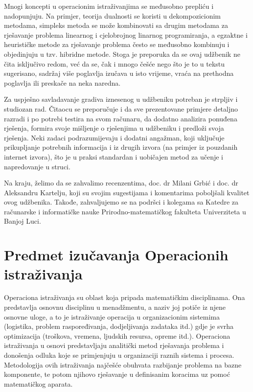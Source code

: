 \documentclass[a4paper, utf8, 11pt, colorlinks]{book}
\theoremstyle{definition}
\begin{document}
Mnogi koncepti u operacionim istraživanjima se međusobno prepliću i nadopunjuju. Na primjer, teorija dualnosti se koristi u dekompozicionim metodama, simpleks metoda se može kombinovati sa drugim metodama za rješavanje problema linearnog i cjelobrojnog linarnog programiranja, a egzaktne i heurističke metode za rješavanje problema često se međusobno kombinuju i objedinjuju u tzv. hibridne metode.
Stoga je preporuka da se ovaj udžbenik ne čita isključivo redom, već da se, čak i mnogo češće nego što je to u tekstu sugerisano, sadržaj više poglavlja izučava u isto vrijeme, vraća na prethodna poglavlja ili preskače na neka naredna.


Za uspješno savladavanje gradiva iznesenog u udžbeniku potreban je strpljiv i studiozan rad. Čitaocu se preporučuje i da sve prezentovane primjere detaljno razradi i po potrebi testira na svom računaru, da dodatno analizira ponuđena rješenja, formira svoje mišljenje o rješenjima u udžbeniku i predloži svoja rješenja. Neki zadaci podrazumijevaju i dodatni angažman, koji uključuje prikupljanje potrebnih informacija i iz drugih izvora (na primjer iz pouzdanih internet izvora),  što je u praksi standardan i uobičajen metod za učenje i napredovanje u struci.

Na kraju, želimo da se zahvalimo recenzentima, doc. dr Milani Grbić i doc. dr Aleksandru Kartelju, koji su svojim sugestijama i komentarima poboljšali kvalitet ovog udžbenika. Takođe, zahvaljujemo se na podršci i kolegama sa Katedre za računarske i informatičke nauke Prirodno-matematičkog fakulteta Univerziteta u Banjoj Luci.



\chapter{Predmet izučavanja Operacionih istraživanja}

Operaciona istraživanja su oblast koja pripada matematičkim disciplinama. Ona predstavlja osnovnu disciplinu u menadžmentu, a naziv joj potiče iz njene osnovne uloge, a to je istraživanje  operacija u organizacionim sistemima (logistika, problem raspoređivanja, dodjeljivanja zadataka itd.) gdje je svrha optimizacija (troškova, vremena, ljudskih resursa, opreme itd.). Operaciona istraživanja u osnovi predstavljaju analitički metod rješavanja problema i donošenja odluka koje se primjenjuju u organizaciji raznih sistema i procesa. Metodologija ovih istraživanja  najčešće obuhvata razbijanje problema na bazne komponente, te potom njihovo rješavanje u definisanim koracima uz pomoć matematičkog aparata. 
\end{document}
